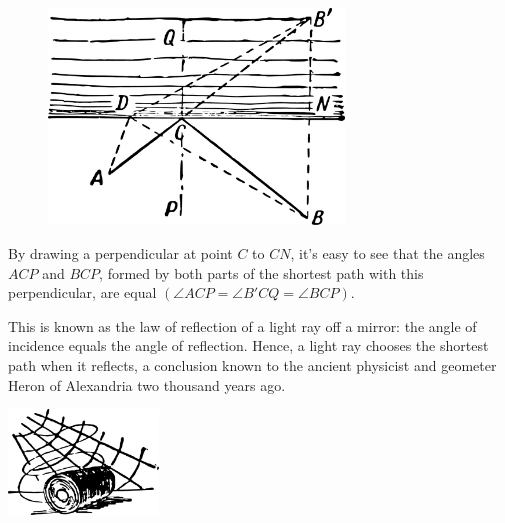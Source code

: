 \begin{figure}%
\centering
\includegraphics[width=0.7\textwidth]{figures/ch-12/fig-192.pdf}
\end{figure}


By drawing a perpendicular at point $C$ to $CN$, it's easy to see that the angles $ACP$ and $BCP$, formed by both parts of the shortest path with this perpendicular, are equal $(\angle ACP = \angle B'CQ = \angle  BCP)$.

This is known as the law of reflection of a light ray off a mirror: the angle of incidence equals the angle of reflection. Hence, a light ray chooses the shortest path when it reflects, a conclusion known to the ancient physicist and geometer Heron of Alexandria two thousand years ago.




\begin{center}
\includegraphics[width=0.3\textwidth]{figures/ch-11/fig-ch-11-tail.pdf}
\end{center}


















